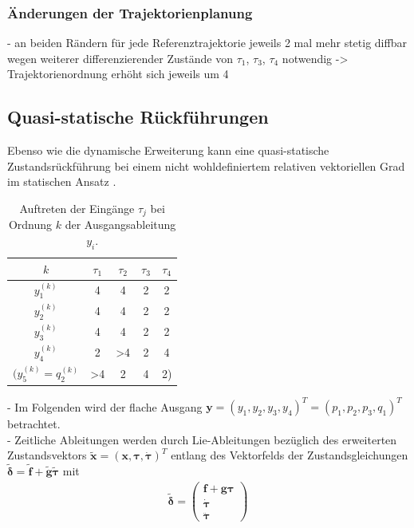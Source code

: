 \subsubsection{Änderungen der Trajektorienplanung}
- an beiden Rändern für jede Referenztrajektorie jeweils 2 mal mehr stetig diffbar wegen weiterer differenzierender Zustände von $\tau_1$, $\tau_3$, $\tau_4$ notwendig -> Trajektorienordnung erhöht sich jeweils um 4

\subsection{Quasi-statische Rückführungen}
Ebenso wie die dynamische Erweiterung kann eine quasi-statische Zustandsrückführung bei einem nicht wohldefiniertem relativen vektoriellen Grad im statischen Ansatz \cite[S. 206]{NLRT_Roebenack}.

\begin{table}[htbp]%
	\centering
	\caption{Auftreten der Eingänge $\tau_j$ bei Ordnung $k$ der Ausgangsableitung $y_i$.}
	\label{tab:relative_degrees}
	\begin{tabular}{ c| c c c c } 
		$k$ & $\tau_1$ & $\tau_2$ & $\tau_3$ & $\tau_4$ \\ 
		\hline
		$y_1^{(k)}$ & 4 & 4 & 2 & 2\\ 
		$y_2^{(k)}$ & 4 & 4 & 2 & 2\\
		$y_3^{(k)}$ & 4 & 4 & 2 & 2\\		
		$y_4^{(k)}$ & 2 & >4 & 2 & 4\\
		$(y_5^{(k)} = q_2^{(k)}$ & >4 & 2 & 4 & 2)\\
	\end{tabular}
\end{table}

- Im Folgenden wird der flache Ausgang $\pmb{y} = (y_1, y_2, y_3, y_4)^T = (p_1, p_2, p_3, q_1)^T$ betrachtet. \\
- Zeitliche Ableitungen werden durch Lie-Ableitungen bezüglich des erweiterten Zustandsvektors $\pmb{\tilde{x}} = (\pmb{x}, \pmb{\tau}, \pmb{\dot{\tau}})^T$ entlang des Vektorfelds der Zustandsgleichungen $\pmb{\tilde{\delta}} = \pmb{\tilde{f}} + \pmb{\tilde{g}} \pmb{\tilde{\tau}}$ mit
\begin{align}
\pmb{\tilde{\delta}} =
\left(\begin{matrix}
\pmb{f} + \pmb{g} \pmb{\tau}\\
\dot{\pmb{\tau}} \\
\ddot{\pmb{\tau}}
\end{matrix}\right)
\end{align}

